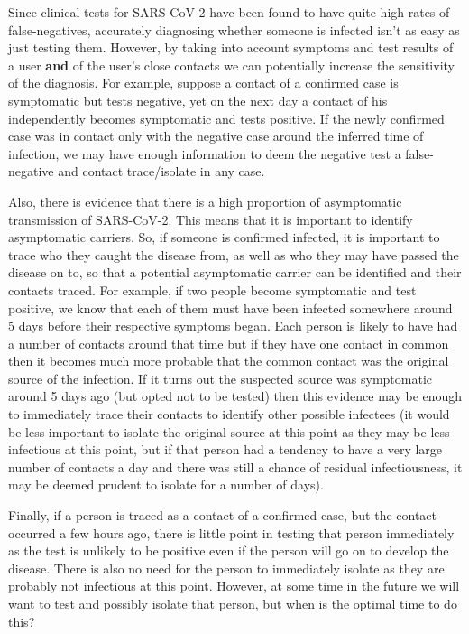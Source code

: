 \documentclass{article}
\begin{document}
Since clinical tests for SARS-CoV-2 have been found to have quite high rates of false-negatives\cite{fang2020sensitivity}, accurately diagnosing whether someone is infected isn't as easy as just testing them. However, by taking into account symptoms and test results of a user \textbf{and} of the user's close contacts we can potentially increase the sensitivity of the diagnosis. For example, suppose a contact of a confirmed case is symptomatic but tests negative, yet on the next day a contact of his independently becomes symptomatic and tests positive. If the newly confirmed case was in contact only with the negative case around the inferred time of infection, we may have enough information to deem the negative test a false-negative and contact trace/isolate in any case.

Also, there is evidence that there is a high proportion of asymptomatic transmission of SARS-CoV-2\cite{lavezzo2020suppression}. This means that it is important to identify asymptomatic carriers. So, if someone is confirmed infected, it is important to trace who they caught the disease from, as well as who they may have passed the disease on to, so that a potential asymptomatic carrier can be identified and their contacts traced. For example, if two people become symptomatic and test positive, we know that each of them must have been infected somewhere around 5 days before their respective symptoms began. Each person is likely to have had a number of contacts around that time but if they have one contact in common then it becomes much more probable that the common contact was the original source of the infection. If it turns out the suspected source was symptomatic around 5 days ago (but opted not to be tested) then this evidence may be enough to immediately trace their contacts to identify other possible infectees (it would be less important to isolate the original source at this point as they may be less infectious at this point, but if that person had a tendency to have a very large number of contacts a day and there was still a chance of residual infectiousness, it may be deemed prudent to isolate for a number of days).

Finally, if a person is traced as a contact of a confirmed case, but the contact occurred a few hours ago, there is little point in testing that person immediately as the test is unlikely to be positive even if the person will go on to develop the disease. There is also no need for the person to immediately isolate as they are probably not infectious at this point. However, at some time in the future we will want to test and possibly isolate that person, but when is the optimal time to do this?
\end{document}
